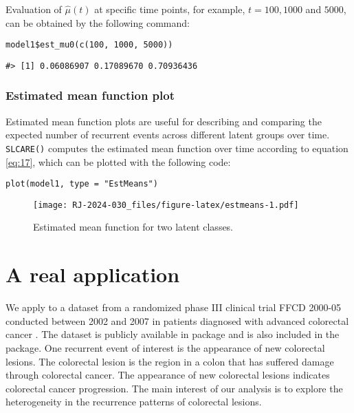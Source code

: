 Evaluation of \(\hat{\mu}(t)\) at specific time points, for example, \(t=100, 1000\) and \(5000\),
can be obtained by the following command:

\begin{verbatim}
model1$est_mu0(c(100, 1000, 5000))
\end{verbatim}

\begin{verbatim}
#> [1] 0.06086907 0.17089670 0.70936436
\end{verbatim}

\hypertarget{estimated-mean-function-plot}{%
\subsubsection{Estimated mean function plot}\label{estimated-mean-function-plot}}

Estimated mean function plots are useful for describing and comparing the expected number of recurrent events across different latent groups over time. \texttt{SLCARE()} computes the estimated mean function over time according to equation \eqref{eq:17}, which can be plotted with the following code:

\begin{verbatim}
plot(model1, type = "EstMeans")
\end{verbatim}

\begin{figure}
\centering
\texttt{[image: RJ-2024-030\_files/figure-latex/estmeans-1.pdf]}
\caption{\label{fig:estmeans}Estimated mean function for two latent classes.}
\end{figure}

\hypertarget{a-real-application}{%
\section{A real application}\label{a-real-application}}

We apply  to a dataset from a randomized phase III clinical trial FFCD 2000-05 conducted between 2002 and 2007 in patients diagnosed with advanced colorectal cancer
\citep{ducreux2011sequential}. The dataset is publicly available in  package \citep{rondeau2012frailtypack} and is also included in the  package. One recurrent event of interest is the appearance of new colorectal lesions. The colorectal lesion is the region in a colon that has suffered damage through colorectal cancer. The appearance of new colorectal lesions indicates colorectal cancer progression. The main interest of our analysis is to explore the heterogeneity in the recurrence patterns of colorectal lesions.


